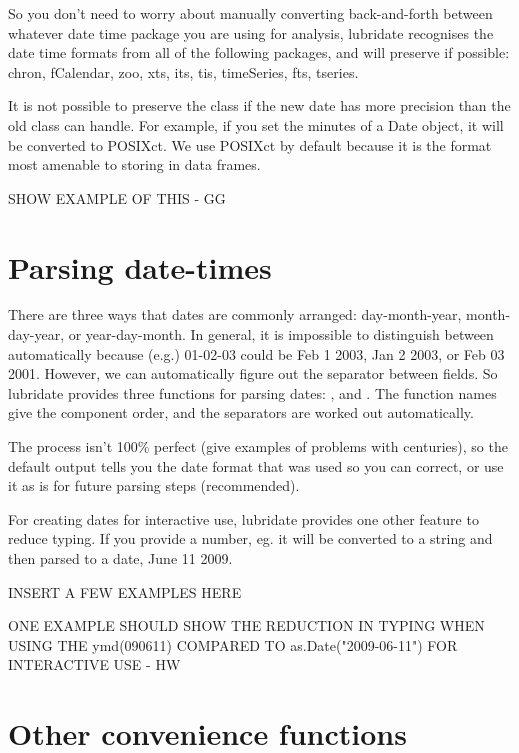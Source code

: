 \documentclass[article]{jss}
\begin{document}
So you don't need to worry about manually converting back-and-forth between whatever date time package you are using for analysis, lubridate recognises the date time formats from all of the following packages, and will preserve if possible: chron, fCalendar, zoo, xts, its, tis, timeSeries, fts, tseries.

It is not possible to preserve the class if the new date has more precision than the old class can handle.  For example, if you set the minutes of a Date object, it will be converted to POSIXct.  We use POSIXct by default because it is the format most amenable to storing in data frames.

SHOW EXAMPLE OF THIS - GG

\section{Parsing date-times}
\label{sec:parsing}

There are three ways that dates are commonly arranged: day-month-year, month-day-year, or year-day-month. In general, it is impossible to distinguish between automatically because (e.g.) 01-02-03 could be Feb 1 2003, Jan 2 2003, or Feb 03 2001.  However, we can automatically figure out the separator between fields.  So lubridate provides three functions for parsing dates: ,  and .  The function names give the component order, and the separators are worked out automatically.  

The process isn't 100\% perfect (give examples of problems with centuries), so the default output tells you the date format that was used so you can correct, or use it as is for future parsing steps (recommended).

For creating dates for interactive use, lubridate provides one other feature to reduce typing.  If you provide a number, eg.  it will be converted to a string  and then parsed to a date, June 11 2009.  

INSERT A FEW EXAMPLES HERE

ONE EXAMPLE SHOULD SHOW THE REDUCTION IN TYPING WHEN USING THE ymd(090611) COMPARED TO as.Date("2009-06-11") FOR INTERACTIVE USE - HW


% 

\section{Other convenience functions}
\label{sec:utils}
\end{document}
